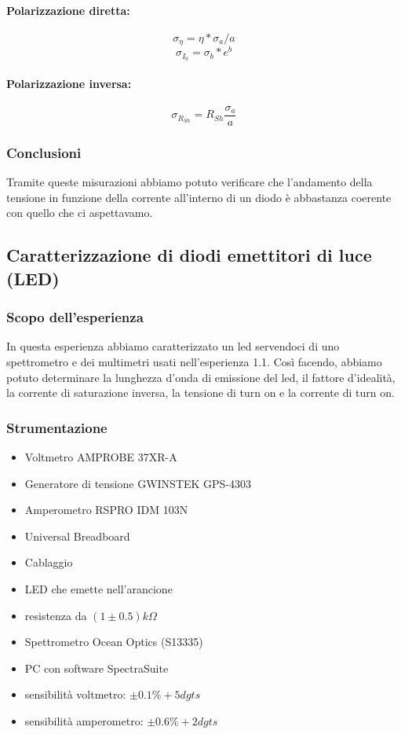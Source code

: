 \documentclass{article}
\begin{document}
\paragraph{Polarizzazione diretta:} 
$$\sigma_{\eta}=\eta*\sigma_a/a$$
$$\sigma_{I_0}=\sigma_b*e^b$$
\paragraph{Polarizzazione inversa:}
$$\sigma_{R_{Sh}}=R_{Sh}\frac{\sigma_a}{a}$$

\subsubsection{Conclusioni}

Tramite queste misurazioni abbiamo potuto verificare che l'andamento della tensione in funzione della corrente all'interno di un diodo è abbastanza coerente con quello che ci aspettavamo.

\subsection{Caratterizzazione di diodi emettitori di luce (LED)}
\subsubsection{Scopo dell'esperienza}
In questa esperienza abbiamo caratterizzato un led servendoci di uno spettrometro e dei multimetri usati nell'esperienza 1.1. Così facendo, abbiamo potuto determinare la lunghezza d'onda di emissione del led, il fattore d'idealità, la corrente di saturazione inversa, la tensione di turn on e la corrente di turn on.

\subsubsection{Strumentazione}
\begin{itemize}
    \item Voltmetro AMPROBE 37XR-A
    \item Generatore di tensione GWINSTEK GPS-4303
    \item Amperometro RSPRO IDM 103N
    \item Universal Breadboard
    \item Cablaggio
    \item LED che emette nell'arancione
    \item resistenza da $(1 \pm 0.5) k\Omega$ 
    \item Spettrometro Ocean Optics (S13335) 
    \item PC con software SpectraSuite    
    \item sensibilità voltmetro: $\pm0.1\% + 5 dgts$
    \item sensibilità amperometro: $\pm0.6\%+2 dgts$
\end{itemize}
\end{document}
